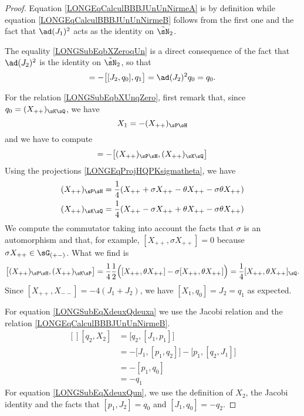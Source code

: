 \begin{proof}
	
	
	Equation \eqref{LONGEqCalculBBBJUnUnNirmeA} is by definition while equation \eqref{LONGEqCalculBBBJUnUnNirmeB} follows from the first one and the fact that $\ad(J_1)^2$ acts as the identity on $\tilde\sN_2$. 

	The equality \eqref{LONGSubEqbXZeroqUn} is a direct consequence of the fact that $\ad(J_2)^2$ is the identity on $\tilde\sN_2$, so that
	\begin{equation}
		[X_1,q_1]=-\big[ [J_2,q_0],q_1 \big]=\ad(J_2)^2q_0=q_0.
	\end{equation}
	
	For the relation \eqref{LONGSubEqbXUnqZero}, first remark that, since $q_0=(X_{++})_{\sK\sQ}$, we have
	\begin{equation}
		X_1=-(X_{++})_{\sP\sH}
	\end{equation}
	and we have to compute
	\begin{equation}
		[X_1,q_0]=-\big[ (X_{++})_{\sP\sH},(X_{++})_{\sK\sQ} \big]
	\end{equation}
	Using the projections \eqref{LONGEqProjHQPKsigmatheta}, we have
	\begin{equation}
		\begin{aligned}[]
			(X_{++})_{\sP\sH}&=\frac{1}{ 4 }(X_{++}+\sigma X_{++}-\theta X_{++}-\sigma\theta X_{++})\\
			(X_{++})_{\sK\sQ}&=\frac{1}{ 4 }(X_{++}-\sigma X_{++}+\theta X_{++}-\sigma\theta X_{++})
		\end{aligned}
	\end{equation}
	We compute the commutator taking into account the facts that $\sigma$ is an automorphism and that, for example, $[X_{++},\sigma X_{++}]=0$ because $\sigma X_{++}\in\sG_{(+-)}$. What we find is
	\begin{equation}
		\big[ (X_{++})_{\sP\sH},(X_{++})_{\sK\sP} \big]=\frac{1}{ 4 }\frac{ 1 }{2}\Big( [X_{++},\theta X_{++}]-\sigma [X_{++},\theta X_{++}] \Big)=\frac{1}{ 4 }[X_{++},\theta X_{++}]_{\sQ}.
	\end{equation}
	Since $[X_{++},X_{--}]=-4(J_1+J_2)$, we have $[X_1,q_0]=J_2=q_1$ as expected.

	
	For equation \eqref{LONGSubEqXdeuxQdeuxa} we use the Jacobi relation and the relation \eqref{LONGEqCalculBBBJUnUnNirmeB}.
	\begin{equation}
		\begin{aligned}[]
			[q_2,X_2]&=\big[ q_2,[J_1,p_1] \big]\\
				&=-\big[ J_1,[p_1,q_2] \big]-\big[ p_1,[q_2,J_1] \big]\\
				&=-[p_1,q_0]\\
				&=-q_1
		\end{aligned}
	\end{equation}
	For equation \eqref{LONGSubEqXdeuxQun}, we use the definition of $X_2$, the Jacobi identity and the facts that $[p_1,J_2]=q_0$ and $[J_1,q_0]=-q_2$.


\end{proof}
